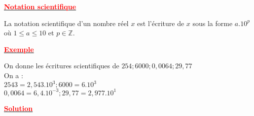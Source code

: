 \documentclass[12pt]{article}
\begin{document}
\begin{center}
\underline{\textbf{\textcolor{red}{Notation scientifique}}}\\
\end{center} 
La notation scientifique d'un nombre réel $x$ est l'écriture de $x$ sous la forme 
$a.10^{p}$ où 
$1 \leq a \leq 10$ et $p \in \mathbb{Z}.$\\

\begin{center}
\underline{\textbf{\textcolor{red}{Exemple}}}\\
\end{center} 
On donne les écritures scientifiques de $254 ; 6000; 0,0064 ; 29,77$\\
On a : \\
$2543=2,543.10^{3} ; 6000=6.10^{3}$\\
$0,0064=6,4.10^{-3} ; 29,77=2,977.10^{1}$
\begin{center}
\underline{\textbf{\textcolor{red}{Solution}}}\\
\end{center}
\end{document}
